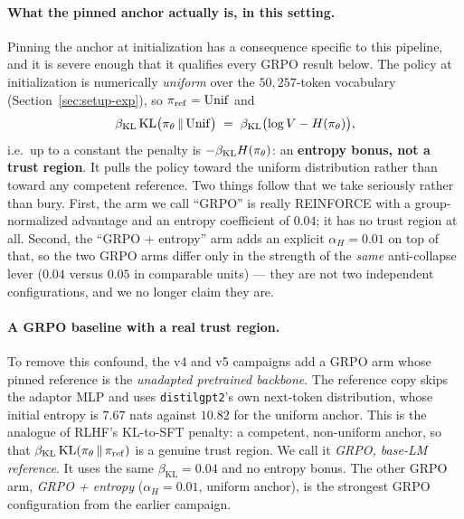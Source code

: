 \paragraph{What the pinned anchor actually is, in this setting.}
\label{sec:algos-caveat}
Pinning the anchor at initialization has a consequence specific to this
pipeline, and it is severe enough that it qualifies every GRPO result below.
The policy at initialization is numerically \emph{uniform} over the
$50{,}257$-token vocabulary (Section~\ref{sec:setup-exp}), so
$\pi_{\mathrm{ref}} = \mathrm{Unif}$ and
\begin{equation}
  \beta_{\mathrm{KL}}\,\mathrm{KL}\bigl(\pi_\theta \,\|\, \mathrm{Unif}\bigr)
  \;=\; \beta_{\mathrm{KL}}\bigl(\log V - H(\pi_\theta)\bigr),
\end{equation}
i.e.\ up to a constant the penalty is $-\beta_{\mathrm{KL}} H(\pi_\theta)$: an
\textbf{entropy bonus, not a trust region}. It pulls the policy toward the
uniform distribution rather than toward any competent reference. Two things
follow that we take seriously rather than bury. First, the arm we call ``GRPO''
is really REINFORCE with a group-normalized advantage and an entropy
coefficient of $0.04$; it has no trust region at all. Second, the
``GRPO + entropy'' arm adds an explicit $\alpha_H = 0.01$ on top of that, so
the two GRPO arms differ only in the strength of the \emph{same}
anti-collapse lever ($0.04$ versus $0.05$ in comparable units) --- they are not
two independent configurations, and we no longer claim they are.

\paragraph{A GRPO baseline with a real trust region.}
To remove this confound, the v4 and v5 campaigns add a GRPO arm whose pinned reference
is the \emph{unadapted pretrained backbone}. The reference copy skips the
adaptor MLP and uses \texttt{distilgpt2}'s own next-token distribution, whose
initial entropy is $7.67$ nats against $10.82$ for the uniform anchor. This is
the analogue of RLHF's KL-to-SFT penalty: a competent, non-uniform anchor, so
that $\beta_{\mathrm{KL}}\,\mathrm{KL}(\pi_\theta\,\|\,\pi_{\mathrm{ref}})$ is a genuine trust
region. We call it \emph{GRPO, base-LM reference}. It uses the same
$\beta_{\mathrm{KL}} = 0.04$ and no entropy bonus. The other GRPO arm,
\emph{GRPO + entropy} ($\alpha_H = 0.01$, uniform anchor), is the strongest
GRPO configuration from the earlier campaign.

